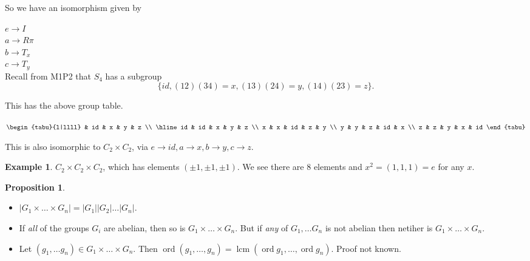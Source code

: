 \documentclass{article}
\theoremstyle{definition}
\newtheorem{proposition}{Proposition}
\newtheorem*{exmp}{Example}
\DeclareMathOperator{\lcm}{lcm}
\DeclareMathOperator{\ord}{\text{ord}}
\begin{document}
So we have an isomorphism given by

$e \rightarrow I$\\
$a \rightarrow R\pi$\\
$b \rightarrow T_x$\\
$c \rightarrow T_y$\\

Recall from M1P2 that $S_4$ has a subgroup $$\{id,  (12)(34)=x, (13)(24)=y, (14)(23)=z\}.$$

This has the above group table.
\begin{table}[!ht]
\centering
$\begin{tabu}{l|llll}
   & id & x  & y  & z \\
   \hline
id & id & x  & y  & z \\
x  & x  & id & z  & y \\
y  & y  & z  & id & x \\
z  & z  & y  & x  & id 
\end{tabu}$
\end{table}

This is also isomorphic to $C_2 \times C_2$, via $e \rightarrow id, a \rightarrow x, b \rightarrow y, c \rightarrow z$.\\

\begin{exmp}
  
$C_2 \times C_2 \times C_2$, which has elements $(\pm 1, \pm 1, \pm 1)$. We see there are 8 elements and $x^2=(1,1,1)=e$ for any $x$.\\
\end{exmp}

\begin{proposition}\hfill
  \label{prp:ordgroup}
\begin{itemize}
  \item $|G_1 \times \ldots \times G_n| =|G_1||G_2|\ldots|G_n|.$
\item If \emph{all} of the groups $G_i$ are abelian, then so is $G_1 \times \ldots \times G_n$. But if \emph{any} of $G_1, \ldots G_n$ is not abelian then netiher is $G_1 \times \ldots \times G_n$.
\item Let $(g_1, \ldots g_n) \in G_1 \times \ldots \times G_n$. Then $\ord (g_1, \ldots , g_n) = \lcm (\ord g_1, \ldots , \ord g_n)$.
Proof not known.
\end{itemize}
\end{proposition}
\end{document}
